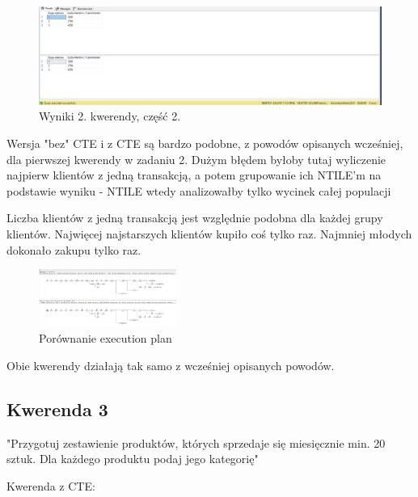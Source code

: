 \documentclass[a4paper,12pt]{article}
\begin{document}
\begin{figure}[H]
	\centering
	\includegraphics[width=1.0\textwidth]{images/2.1.png}
	\caption{Wyniki 2. kwerendy, część 2.}
\end{figure}

Wersja "bez" CTE i z CTE są bardzo podobne, z powodów opisanych wcześniej, dla pierwszej kwerendy w zadaniu 2. Dużym błędem byłoby tutaj wyliczenie najpierw klientów z jedną transakcją, a potem grupowanie ich NTILE'm na podstawie wyniku - NTILE wtedy analizowałby tylko wycinek całej populacji

Liczba klientów z jedną transakcją jest względnie podobna dla każdej grupy klientów. Najwięcej najstarszych klientów kupiło coś tylko raz. Najmniej młodych dokonało zakupu tylko raz.

\begin{figure}[H]
	\centering
	\includegraphics[width=0.4\textwidth]{images/2_execution_plan.png}
	\caption{Porównanie execution plan}
\end{figure}

Obie kwerendy działają tak samo z wcześniej opisanych powodów.

\subsection{Kwerenda 3}

"Przygotuj zestawienie produktów, których sprzedaje się miesięcznie min. 20 sztuk. Dla każdego produktu podaj jego kategorię"

Kwerenda z CTE:
\end{document}
